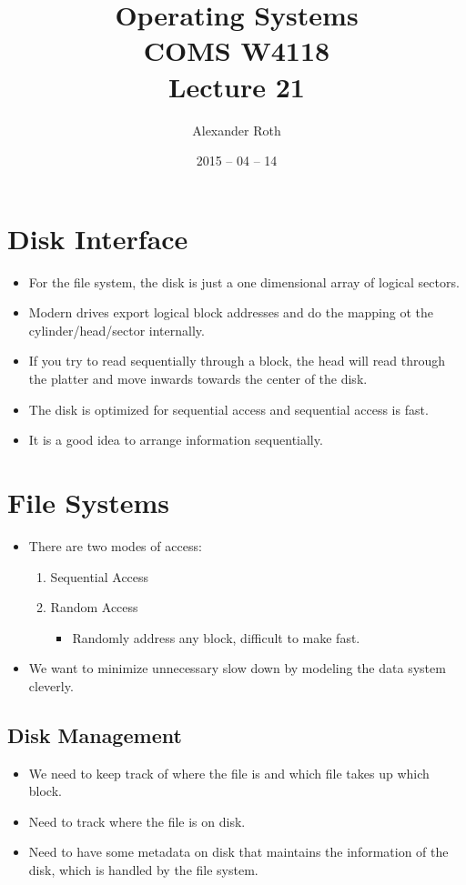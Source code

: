 \documentclass[]{article}
\begin{document}
\newtheorem{thm}{Theorem}
\title{Operating Systems \\ COMS W4118 \\ Lecture 21}
\author{Alexander Roth}
\date{2015 -- 04 -- 14}
\maketitle

\section{Disk Interface}
\begin{itemize}
\item For the file system, the disk is just a one dimensional array of logical
sectors.
\item Modern drives export logical block addresses and do the mapping ot the
cylinder/head/sector internally.
\item If you try to read sequentially through a block, the head will read
through the platter and move inwards towards the center of the disk.
\item The disk is optimized for sequential access and sequential access is fast.
\item It is a good idea to arrange information sequentially.
\end{itemize}

\section{File Systems}
\begin{itemize}
\item There are two modes of access:
\begin{enumerate}
\item Sequential Access
\item Random Access
\begin{itemize}
\item Randomly address any block, difficult to make fast.
\end{itemize}
\end{enumerate}
\item We want to minimize unnecessary slow down by modeling the data system
cleverly.
\end{itemize}

\subsection{Disk Management}
\begin{itemize}
\item We need to keep track of where the file is and which file takes up which
block.
\item Need to track where the file is on disk.
\item Need to have some metadata on disk that maintains the information of the
disk, which is handled by the file system.
\end{itemize}
\end{document}
